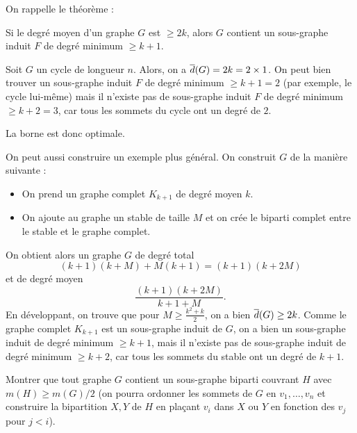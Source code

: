 \begin{td-sol}
    On rappelle le théorème :
    \begin{theorem}
        Si le degré moyen d'un graphe \(G\) est \(\geq 2k\), alors \(G\) contient un sous-graphe induit \(F\) de degré minimum \(\geq k + 1\).
    \end{theorem}

    Soit \(G\) un cycle de longueur \(n\). Alors, on a \(\overline{d}(G) = 2k = 2 \times 1\).
    On peut bien trouver un sous-graphe induit \(F\) de degré minimum \(\geq k + 1 = 2\) (par exemple, le cycle lui-même) mais il n'existe pas de sous-graphe induit \(F\) de degré minimum \(\geq k + 2 = 3\), car tous les sommets du cycle ont un degré de \(2\).

    La borne est donc optimale.

    On peut aussi construire un exemple plus général. On construit \(G\) de la manière suivante :
    \begin{itemize}
        \item On prend un graphe complet \(K_{k + 1}\) de degré moyen \(k\).
        \item On ajoute au graphe un stable de taille \(M\) et on crée le biparti complet entre le stable et le graphe complet.
    \end{itemize}
    On obtient alors un graphe \(G\) de degré total
    \begin{equation*}
        (k+1)(k+M) + M(k+1) = (k+1)(k+2M)
    \end{equation*}
    et de degré moyen
    \begin{equation*}
        \frac{(k+1)(k+2M)}{k+1+M}.
    \end{equation*}
    En développant, on trouve que pour \(M \geq \frac{k^2 + k}{2}\), on a bien \(\overline{d}(G) \geq 2k\).
    Comme le graphe complet \(K_{k + 1}\) est un sous-graphe induit de \(G\), on a bien un sous-graphe induit de degré minimum \(\geq k + 1\), mais il n'existe pas de sous-graphe induit de degré minimum \(\geq k + 2\), car tous les sommets du stable ont un degré de \(k + 1\).
\end{td-sol}

\begin{td-exo}
    Montrer que tout graphe \(G\) contient un sous-graphe biparti couvrant \(H\) avec \(m(H) \geq m(G)/2\) (on pourra ordonner les sommets de \(G\) en \(v_1,\ldots,v_n\) et construire la bipartition \(X, Y\) de \(H\) en plaçant \(v_i\) dans \(X\) ou \(Y\) en fonction des \(v_j\) pour \(j < i\)).
\end{td-exo}

